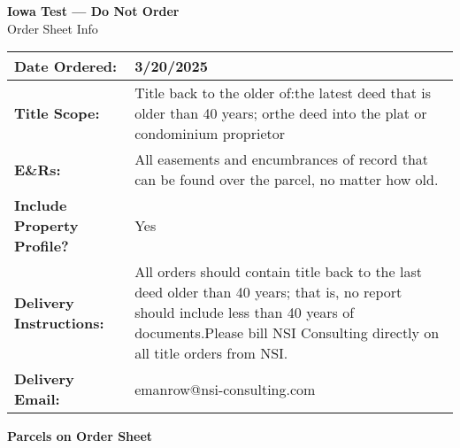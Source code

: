 \documentclass[a4paper,12pt]{article}
\begin{document}
\begin{center}
    {\LARGE \textbf{Iowa Test — Do Not Order}} \\
    \vspace{0.5em}
    {\Large Order Sheet Info}
\end{center}

\vspace{1.5em}

\begin{tabularx}{\textwidth}{@{} l X @{}}
    \toprule
    \textbf{Date Ordered:} & 3/20/2025 \\
    \midrule
    \textbf{Title Scope:} & Title back to the older of:\newline the latest deed that is older than 40 years; or\newline the deed into the plat or condominium proprietor\newline \newline  \\
    \midrule
    \textbf{E\&Rs:} & All easements and encumbrances of record that can be found over the parcel, no matter how old.\newline  \\
    \midrule
    \textbf{Include Property Profile?} & Yes \\
    \midrule
    \textbf{Delivery Instructions:} & All orders should contain title back to the last deed older than 40 years; that is, no report should include less than 40 years of documents.\newline \newline Please bill NSI Consulting directly on all title orders from NSI.\newline \newline  \\
    \midrule
    \textbf{Delivery Email:} & emanrow@nsi-consulting.com \\
    \bottomrule
\end{tabularx}

\vspace{2em}

\begin{center}
    {\Large \textbf{Parcels on Order Sheet}}
\end{center}

\vspace{1em}
\end{document}
